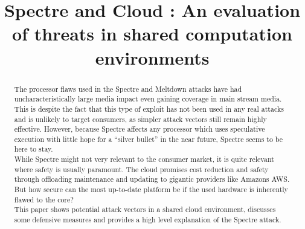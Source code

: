 \documentclass[conference,compsoc,final,a4paper]{IEEEtran}
\newcommand{\autoren}[0]{Mundhenke, Moritz}
\newcommand{\dokumententitel}[0]{Spectre and Cloud : An evaluation of threats in shared computation environments }
\begin{document}
\title{\dokumententitel}

\author{
  \IEEEauthorblockN{\autoren}
}

\maketitle
\thispagestyle{plain}
\pagestyle{plain}


\begin{abstract}
The processor flaws used in the Spectre and Meltdown attacks have had uncharacteristically large media impact even gaining coverage in main stream media. This is despite the fact that this type of exploit has not been used in any real attacks and is unlikely to target consumers, as simpler attack vectors still remain highly effective. However, because Spectre affects any processor which uses speculative execution with little hope for a \enquote{silver bullet} in the near future, Spectre seems to be here to stay. \\
While Spectre might not very relevant to the consumer market, it is quite relevant where safety is usually paramount. The cloud promises cost reduction and safety through offloading maintenance and updating to gigantic providers like Amazons AWS. But how secure can the most up-to-date platform be if the used hardware is inherently flawed to the core? \\
This paper shows potential attack vectors in a shared cloud environment, discusses some defensive measures and provides a high level explanation of the Spectre attack.
\end{abstract}

\tableofcontents

\end{document}

